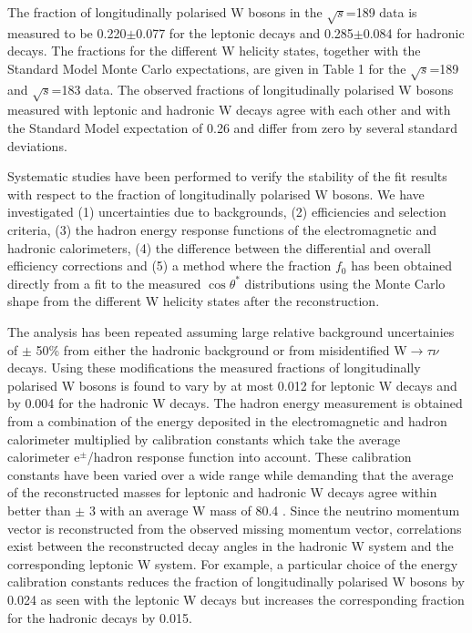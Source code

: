 \documentclass[12pt,a4paper,dvips]{article}
\begin{document}
The fraction of longitudinally polarised W bosons in the 
$\sqrt{s}$=189 \GeV{} data is measured to be 
0.220$\pm$0.077 for the leptonic decays and 0.285$\pm$0.084 for hadronic 
decays. The fractions for the different W helicity states,
together with the Standard Model Monte Carlo expectations, are given 
in Table 1 for the $\sqrt{s}$=189 \GeV{} and $\sqrt{s}$=183 \GeV{} data.
The observed fractions of longitudinally polarised W bosons
measured with leptonic and hadronic W decays agree with each other 
and with the Standard Model 
expectation of 0.26 and differ from zero by several standard 
deviations.

Systematic studies have been performed to  
verify the stability of the fit results with respect to the 
fraction of longitudinally polarised W bosons. We have investigated 
(1) uncertainties due to backgrounds, 
(2) efficiencies and selection criteria, 
(3) the hadron energy response functions of the 
electromagnetic and hadronic calorimeters,
(4) the difference between the differential
and overall efficiency corrections and 
(5) a method where the fraction $f_{0}$
has been obtained directly from a fit to the measured $\cos \theta^{*}$
distributions using the Monte Carlo shape from the different 
W helicity states after the reconstruction.  

The analysis has been repeated assuming 
large relative background uncertainies of $\pm$ 50\%
from either the hadronic background or from misidentified 
W$ \rightarrow \tau \nu$ decays.  
Using these modifications the measured fractions of longitudinally polarised
W bosons is found to vary by at most 0.012 for leptonic W decays and 
by 0.004 for the hadronic W decays. The hadron energy measurement 
is obtained from a combination of the energy deposited in the 
electromagnetic and hadron calorimeter multiplied by
calibration constants which take the average calorimeter e$^{\pm}$/hadron 
response function into account. 
These calibration constants have been varied over a wide range
while demanding that  
the average of the reconstructed masses 
for leptonic and hadronic W decays agree
within better than $\pm$ 3 \GeV{} with an average W mass of 
80.4 \GeV{}. Since the neutrino momentum vector is reconstructed 
from the observed missing momentum vector, correlations exist  
between the reconstructed decay angles 
in the hadronic W system and the corresponding leptonic 
W system. For example, a particular choice of the 
energy calibration constants reduces the fraction of longitudinally 
polarised W bosons by 0.024 as seen with the leptonic W decays 
but increases the corresponding fraction 
for the hadronic decays by 0.015. 
\end{document}

